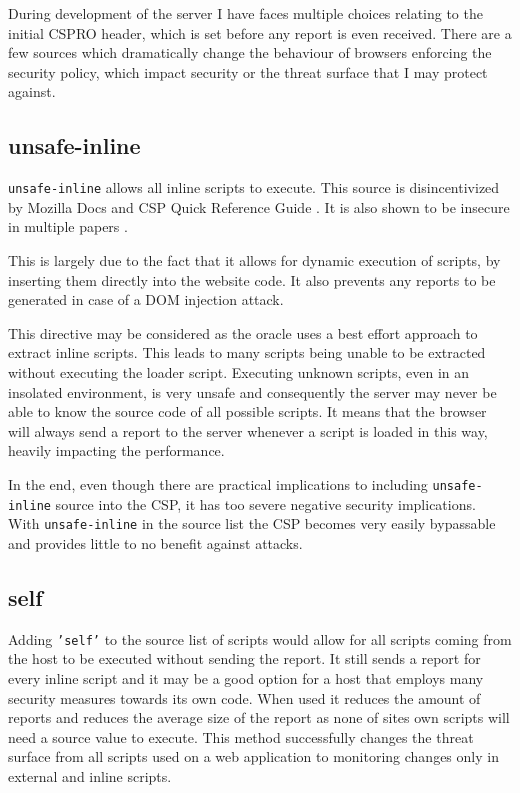 During development of the server I have faces multiple choices relating to the initial CSPRO header, which is set before any report is even received.
There are a few sources which dramatically change the behaviour of browsers enforcing the security policy, which impact security or the threat surface that I may protect against.

\subsection{unsafe-inline}

\texttt{unsafe-inline} allows all inline scripts to execute. 
This source is disincentivized by Mozilla Docs \cite{unsafeinlinebad2} and CSP Quick Reference Guide \cite{unsafeinlinebad1}.
It is also shown to be insecure in multiple papers \cite{weichselbaum2016csp} \cite{osti_10173479}.

This is largely due to the fact that it allows for dynamic execution of scripts, by inserting them directly into the website code.
It also prevents any reports to be generated in case of a DOM injection attack.

This directive may be considered as the oracle uses a best effort approach to extract inline scripts.
This leads to many scripts being unable to be extracted without executing the loader script.
Executing unknown scripts, even in an insolated environment, is very unsafe and consequently the server may never be able to know the source code of all possible scripts.
It means that the browser will always send a report to the server whenever a script is loaded in this way, heavily impacting the performance.

In the end, even though there are practical implications to including \texttt{unsafe-inline} source into the CSP, it has too severe negative security implications.
With \texttt{unsafe-inline} in the source list the CSP becomes very easily bypassable and provides little to no benefit against attacks.

\subsection{self}

Adding \texttt{'self'} to the source list of scripts would allow for all scripts coming from the host to be executed without sending the report.
It still sends a report for every inline script and it  may be a good option for a host that employs many security measures towards its own code.
When used it reduces the amount of reports and reduces the average size of the report as none of sites own scripts will need a source value to execute.
This method successfully changes the threat surface from all scripts used on a web application to monitoring changes only in external and inline scripts.

